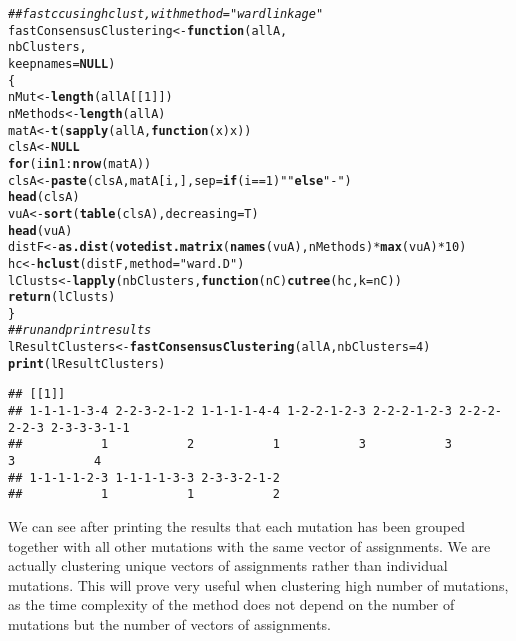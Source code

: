 \documentclass{article}\usepackage[]{graphicx}\usepackage[]{color}
\makeatletter
\newcommand{\hlnum}[1]{\textcolor[rgb]{0.686,0.059,0.569}{#1}}%
\newcommand{\hlstr}[1]{\textcolor[rgb]{0.192,0.494,0.8}{#1}}%
\newcommand{\hlcom}[1]{\textcolor[rgb]{0.678,0.584,0.686}{\textit{#1}}}%
\newcommand{\hlopt}[1]{\textcolor[rgb]{0,0,0}{#1}}%
\newcommand{\hlstd}[1]{\textcolor[rgb]{0.345,0.345,0.345}{#1}}%
\newcommand{\hlkwa}[1]{\textcolor[rgb]{0.161,0.373,0.58}{\textbf{#1}}}%
\newcommand{\hlkwb}[1]{\textcolor[rgb]{0.69,0.353,0.396}{#1}}%
\newcommand{\hlkwc}[1]{\textcolor[rgb]{0.333,0.667,0.333}{#1}}%
\newcommand{\hlkwd}[1]{\textcolor[rgb]{0.737,0.353,0.396}{\textbf{#1}}}%
\newenvironment{kframe}{%
 \def\at@end@of@kframe{}%
 \ifinner\ifhmode%
  \def\at@end@of@kframe{\end{minipage}}%
  \begin{minipage}{\columnwidth}%
 \fi\fi%
 \def\FrameCommand##1{\hskip\@totalleftmargin \hskip-\fboxsep
 \colorbox{shadecolor}{##1}\hskip-\fboxsep
     \hskip-\linewidth \hskip-\@totalleftmargin \hskip\columnwidth}%
 \MakeFramed {\advance\hsize-\width
   \@totalleftmargin\z@ \linewidth\hsize
   \@setminipage}}%
 {\par\unskip\endMakeFramed%
 \at@end@of@kframe}
\newenvironment{knitrout}{}{} %
\makeatother
\begin{document}
\begin{knitrout}
\begin{kframe}
\begin{alltt}
\hlcom{## fast cc using hclust, with method="ward linkage"}
\hlstd{fastConsensusClustering} \hlkwb{<-} \hlkwa{function}\hlstd{(}\hlkwc{allA}\hlstd{,}
                                    \hlkwc{nbClusters}\hlstd{,}
                                    \hlkwc{keepnames}\hlstd{=}\hlkwa{NULL}\hlstd{)}
\hlstd{\{}
    \hlstd{nMut} \hlkwb{<-} \hlkwd{length}\hlstd{(allA[[}\hlnum{1}\hlstd{]])}
    \hlstd{nMethods} \hlkwb{<-} \hlkwd{length}\hlstd{(allA)}
    \hlstd{matA} \hlkwb{<-} \hlkwd{t}\hlstd{(}\hlkwd{sapply}\hlstd{(allA,}\hlkwa{function}\hlstd{(}\hlkwc{x}\hlstd{) x))}
    \hlstd{clsA} \hlkwb{<-} \hlkwa{NULL}
    \hlkwa{for}\hlstd{(i} \hlkwa{in} \hlnum{1}\hlopt{:}\hlkwd{nrow}\hlstd{(matA))}
        \hlstd{clsA} \hlkwb{<-} \hlkwd{paste}\hlstd{(clsA,matA[i,],}\hlkwc{sep}\hlstd{=}\hlkwa{if}\hlstd{(i}\hlopt{==}\hlnum{1}\hlstd{)} \hlstr{""} \hlkwa{else} \hlstr{"-"}\hlstd{)}
    \hlkwd{head}\hlstd{(clsA)}
    \hlstd{vuA} \hlkwb{<-} \hlkwd{sort}\hlstd{(}\hlkwd{table}\hlstd{(clsA),}\hlkwc{decreasing}\hlstd{=T)}
    \hlkwd{head}\hlstd{(vuA)}
    \hlstd{distF} \hlkwb{<-} \hlkwd{as.dist}\hlstd{(}\hlkwd{votedist.matrix}\hlstd{(}\hlkwd{names}\hlstd{(vuA),nMethods)}\hlopt{*}\hlkwd{max}\hlstd{(vuA)}\hlopt{*}\hlnum{10}\hlstd{)}
    \hlstd{hc} \hlkwb{<-} \hlkwd{hclust}\hlstd{(distF,}\hlkwc{method}\hlstd{=}\hlstr{"ward.D"}\hlstd{)}
    \hlstd{lClusts} \hlkwb{<-} \hlkwd{lapply}\hlstd{(nbClusters,}\hlkwa{function}\hlstd{(}\hlkwc{nC}\hlstd{)} \hlkwd{cutree}\hlstd{(hc,}\hlkwc{k}\hlstd{=nC))}
    \hlkwd{return}\hlstd{(lClusts)}
\hlstd{\}}
\hlcom{## run and print results}
\hlstd{lResultClusters} \hlkwb{<-} \hlkwd{fastConsensusClustering}\hlstd{(allA,}\hlkwc{nbClusters}\hlstd{=}\hlnum{4}\hlstd{)}
\hlkwd{print}\hlstd{(lResultClusters)}
\end{alltt}
\begin{verbatim}
## [[1]]
## 1-1-1-1-3-4 2-2-3-2-1-2 1-1-1-1-4-4 1-2-2-1-2-3 2-2-2-1-2-3 2-2-2-2-2-3 2-3-3-3-1-1 
##           1           2           1           3           3           3           4 
## 1-1-1-1-2-3 1-1-1-1-3-3 2-3-3-2-1-2 
##           1           1           2
\end{verbatim}
\end{kframe}
\end{knitrout}

We can see after printing the results that each mutation has been
grouped together with all other mutations with the same vector of
assignments.
We are actually clustering unique vectors of assignments rather than
individual mutations. This will prove very useful when clustering high
number of mutations, as the time complexity of the method does not
depend on the number of mutations but the number of vectors of assignments.\\
\end{document}

